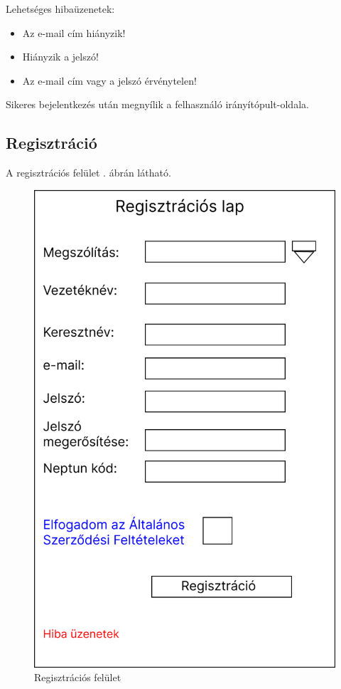 \documentclass[a4paper,12pt]{article}
\begin{document}
Lehetséges hibaüzenetek:
\begin{itemize}
	\item Az e-mail cím hiányzik!
	\item Hiányzik a jelszó!
	\item Az e-mail cím vagy a jelszó érvénytelen!
\end{itemize}

Sikeres bejelentkezés után megnyílik a felhasználó irányítópult-oldala.

\subsection{Regisztráció}

A regisztrációs felület . ábrán látható.

\begin{figure}[h!]
	\centering
	\includegraphics[scale=0.4]{images/Web_pages/Registration.jpg}
	\caption{Regisztrációs felület}
	\label{fig:Registration}
\end{figure}
\end{document}
